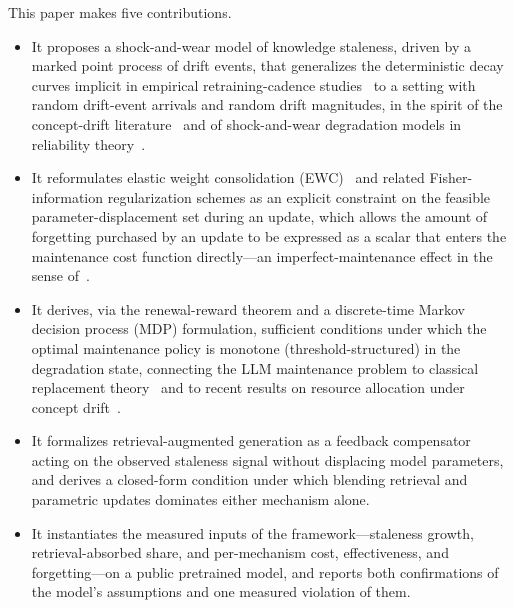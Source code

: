\documentclass[electronics,article,submit,pdftex,moreauthors]{Definitions/mdpi}
\begin{document}
This paper makes five contributions.
\begin{itemize}
\item It proposes a shock-and-wear model of knowledge staleness, driven by a marked point process of drift events, that generalizes the deterministic decay curves implicit in empirical retraining-cadence studies~\cite{Williams2026} to a setting with random drift-event arrivals and random drift magnitudes, in the spirit of the concept-drift literature~\cite{Lu2019} and of shock-and-wear degradation models in reliability theory~\cite{vanNoortwijk2009}.
\item It reformulates elastic weight consolidation (EWC)~\cite{Kirkpatrick2017} and related Fisher-information regularization schemes as an explicit constraint on the feasible parameter-displacement set during an update, which allows the amount of forgetting purchased by an update to be expressed as a scalar that enters the maintenance cost function directly---an imperfect-maintenance effect in the sense of~\cite{Pham1996}.
\item It derives, via the renewal-reward theorem and a discrete-time Markov decision process (MDP) formulation, sufficient conditions under which the optimal maintenance policy is monotone (threshold-structured) in the degradation state, connecting the LLM maintenance problem to classical replacement theory~\cite{Barlow1965} and to recent results on resource allocation under concept drift~\cite{Beytur2025}.
\item It formalizes retrieval-augmented generation as a feedback compensator acting on the observed staleness signal without displacing model parameters, and derives a closed-form condition under which blending retrieval and parametric updates dominates either mechanism alone.
\item It instantiates the measured inputs of the framework---staleness growth, retrieval-absorbed share, and per-mechanism cost, effectiveness, and forgetting---on a public pretrained model, and reports both confirmations of the model's assumptions and one measured violation of them.
\end{itemize}
\end{document}

